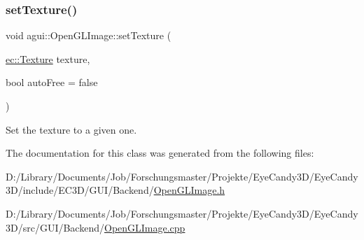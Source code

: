 \subsubsection{\texorpdfstring{set\+Texture()}{setTexture()}}
{\footnotesize\ttfamily void agui\+::\+Open\+G\+L\+Image\+::set\+Texture (\begin{DoxyParamCaption}\item[{\mbox{\hyperlink{classec_1_1_texture}{ec\+::\+Texture}}}]{texture,  }\item[{bool}]{auto\+Free = {\ttfamily false} }\end{DoxyParamCaption})}

Set the texture to a given one. 

The documentation for this class was generated from the following files\+:\begin{DoxyCompactItemize}
\item 
D\+:/\+Library/\+Documents/\+Job/\+Forschungsmaster/\+Projekte/\+Eye\+Candy3\+D/\+Eye\+Candy3\+D/include/\+E\+C3\+D/\+G\+U\+I/\+Backend/\mbox{\hyperlink{_open_g_l_image_8h}{Open\+G\+L\+Image.\+h}}\item 
D\+:/\+Library/\+Documents/\+Job/\+Forschungsmaster/\+Projekte/\+Eye\+Candy3\+D/\+Eye\+Candy3\+D/src/\+G\+U\+I/\+Backend/\mbox{\hyperlink{_open_g_l_image_8cpp}{Open\+G\+L\+Image.\+cpp}}\end{DoxyCompactItemize}
